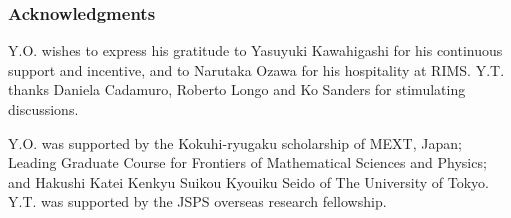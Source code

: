 \documentclass[a4paper,12pt]{article}
\theoremstyle{plain}
\theoremstyle{definition}
\theoremstyle{remark}
\begin{document}

\subsubsection*{Acknowledgments}
Y.O.\!  wishes to express his gratitude to Yasuyuki Kawahigashi for his continuous support and incentive, and to Narutaka Ozawa for his hospitality at RIMS.
Y.T.\! thanks Daniela Cadamuro, Roberto Longo and Ko Sanders for stimulating discussions.

Y.O.\! was supported by the Kokuhi-ryugaku scholarship of MEXT, Japan; Leading Graduate Course for Frontiers of Mathematical Sciences and Physics; and Hakushi Katei Kenkyu Suikou Kyouiku Seido of The University of Tokyo.
Y.T.\! was supported by the JSPS overseas research fellowship.
\end{document}
